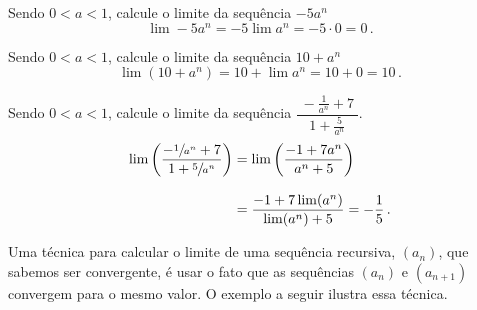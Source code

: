 \begin{example}
  Sendo $0<a<1$, calcule o limite da sequência \(-5a^n\)
  \solution
  \[
    \lim -5a^n = -5\lim a^n= -5 \cdot 0 = 0  \,.
  \]
\end{example}

\begin{example}
  Sendo $0<a<1$, calcule o limite da sequência \(10+a^n\)
  \solution
  \[
    \lim (10+a^n) = 10+\lim a^n = 10+0 = 10  \,.
  \]
\end{example}

\begin{example}
    Sendo $0<a<1$, calcule o limite da sequência
    \(
      \dfrac{\;-\frac{1}{a^n}+7\;}{ 1 + \frac{5}{a^n}}
    \).
    \solution
    \vspace{-0.5\baselineskip}
    \begin{align*}
      \lim \left(\frac{-\sfrac{1}{a^n}+7}{1+ \sfrac{5}{a^n}}\right)
          & = \lim \left(\frac{-1+7a^n}{a^n+5}\right) \\[3mm]
          & = \dfrac{-1+7\lim(a^n)}{\lim(a^n) + 5}
            =-\frac{1}{5}  \,.
    \end{align*}
\end{example}

Uma técnica para calcular o limite de uma sequência
recursiva, $(a_n)$, que sabemos ser convergente, é
usar o fato que as sequências $(a_n)$ e $(a_{n+1})$ convergem para o mesmo
valor. O exemplo a seguir ilustra essa técnica.

